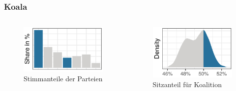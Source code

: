 \documentclass[aspectratio=169,xcolor=dvipsnames]{beamer}
\begin{document}
\begin{frame}
	\frametitle{Koala}
	\begin{columns}
		\begin{column}{0.5\textwidth}
			\begin{figure}[t!]
				\includegraphics[height=0.5\textheight]{partyshare}
				\caption{Stimmanteile der Parteien}
			\end{figure}
		\end{column}
		\begin{column}{0.5\textwidth}
			\begin{figure}[h!]
				\includegraphics[height=0.5\textheight]{poe}
				\caption{Sitzanteil für Koalition}
			\end{figure}
		\end{column}
	\end{columns}
\end{frame}
\end{document}
